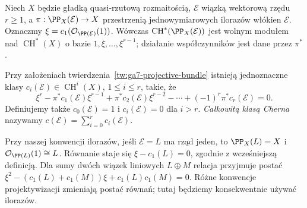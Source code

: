 \begin{twierdzenie}
\label{tw:ga7-projective-bundle}
Niech $X$ będzie gładką quasi-rzutową rozmaitością,
$\mathcal E$ wiązką wektorową rzędu $r\ge1$, a
$\pi:\PP_X(\mathcal E)\to X$ przestrzenią
jednowymiarowych ilorazów włókien $\mathcal E$.
Oznaczmy $\xi=c_1(\mathcal O_{\PP(\mathcal E)}(1))$.
Wówczas $\operatorname{CH}^*(\PP_X(\mathcal E))$ jest
wolnym modułem nad $\operatorname{CH}^*(X)$ o bazie
$1,\xi,\ldots,\xi^{r-1}$; działanie współczynników
jest dane przez $\pi^*$.
\end{twierdzenie}

\begin{definicja}
\label{def:ga7-c-classes}
Przy założeniach twierdzenia~\ref{tw:ga7-projective-bundle}
istnieją jednoznaczne klasy
$c_i(\mathcal E)\in\operatorname{CH}^i(X)$, $1\le i\le r$,
takie, że
\[
\xi^r-\pi^*c_1(\mathcal E)\xi^{r-1}
+\pi^*c_2(\mathcal E)\xi^{r-2}
-\cdots+(-1)^r\pi^*c_r(\mathcal E)=0.
\]
Definiujemy także $c_0(\mathcal E)=1$ i
$c_i(\mathcal E)=0$ dla $i>r$.
\emph{Całkowitą klasą Cherna} nazywamy
$c(\mathcal E)=\sum_{i=0}^r c_i(\mathcal E)$.
\end{definicja}

\begin{uwaga}
Przy naszej konwencji ilorazów, jeśli $\mathcal E=L$
ma rząd jeden, to $\PP_X(L)=X$ i
$\mathcal O_{\PP(L)}(1)\cong L$. Równanie staje się
$\xi-c_1(L)=0$, zgodnie z wcześniejszą definicją.
Dla sumy dwóch wiązek liniowych $L\oplus M$ relacja
przyjmuje postać
$\xi^2-(c_1(L)+c_1(M))\xi+c_1(L)c_1(M)=0$.
Różne konwencje projektywizacji zmieniają postać
równań; tutaj będziemy konsekwentnie używać ilorazów.
\end{uwaga}

